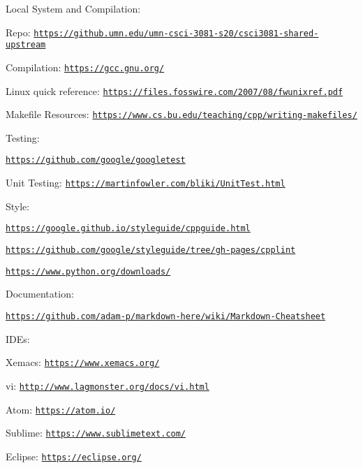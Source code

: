 Local System and Compilation\+:
\begin{DoxyItemize}
\item Repo\+: \href{https://github.umn.edu/umn-csci-3081-s20/csci3081-shared-upstream}{\tt https\+://github.\+umn.\+edu/umn-\/csci-\/3081-\/s20/csci3081-\/shared-\/upstream}
\item Compilation\+: \href{https://gcc.gnu.org/}{\tt https\+://gcc.\+gnu.\+org/}
\item Linux quick reference\+: \href{https://files.fosswire.com/2007/08/fwunixref.pdf}{\tt https\+://files.\+fosswire.\+com/2007/08/fwunixref.\+pdf}
\item Makefile Resources\+: \href{https://www.cs.bu.edu/teaching/cpp/writing-makefiles/}{\tt https\+://www.\+cs.\+bu.\+edu/teaching/cpp/writing-\/makefiles/}
\end{DoxyItemize}

Testing\+:
\begin{DoxyItemize}
\item \href{https://github.com/google/googletest}{\tt https\+://github.\+com/google/googletest}
\item Unit Testing\+: \href{https://martinfowler.com/bliki/UnitTest.html}{\tt https\+://martinfowler.\+com/bliki/\+Unit\+Test.\+html}
\end{DoxyItemize}

Style\+:
\begin{DoxyItemize}
\item \href{https://google.github.io/styleguide/cppguide.html}{\tt https\+://google.\+github.\+io/styleguide/cppguide.\+html}
\item \href{https://github.com/google/styleguide/tree/gh-pages/cpplint}{\tt https\+://github.\+com/google/styleguide/tree/gh-\/pages/cpplint}
\item \href{https://www.python.org/downloads/}{\tt https\+://www.\+python.\+org/downloads/}
\end{DoxyItemize}

Documentation\+:
\begin{DoxyItemize}
\item \href{https://github.com/adam-p/markdown-here/wiki/Markdown-Cheatsheet}{\tt https\+://github.\+com/adam-\/p/markdown-\/here/wiki/\+Markdown-\/\+Cheatsheet}
\end{DoxyItemize}

I\+D\+Es\+:
\begin{DoxyItemize}
\item Xemacs\+: \href{https://www.xemacs.org/}{\tt https\+://www.\+xemacs.\+org/}
\item vi\+: \href{http://www.lagmonster.org/docs/vi.html}{\tt http\+://www.\+lagmonster.\+org/docs/vi.\+html}
\item Atom\+: \href{https://atom.io/}{\tt https\+://atom.\+io/}
\item Sublime\+: \href{https://www.sublimetext.com/}{\tt https\+://www.\+sublimetext.\+com/}
\item Eclipse\+: \href{https://eclipse.org/}{\tt https\+://eclipse.\+org/} 
\end{DoxyItemize}